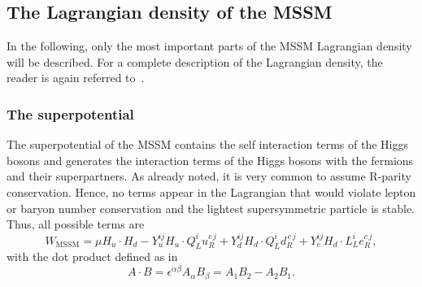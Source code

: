 \renewcommand{\arraystretch}{1.5}
\begin{table}[!h]
\centering
\caption{Vector supermultiplets in the MSSM.}
\label{tab:vector_multiplets}
\end{table}  



\subsection{The Lagrangian density of the MSSM}
\label{sec:Lagrange_MSSM}
In the following, only the most important parts of the MSSM Lagrangian density will be described.
For a complete description of the Lagrangian density, the reader is again referred to~\cite{bib:Drees_2004}.

\subsubsection*{The superpotential}
The superpotential of the MSSM contains the self interaction terms of the Higgs bosons and generates the interaction terms of the Higgs bosons with the fermions and their superpartners.
As already noted, it is very common to assume R-parity conservation.
Hence, no terms appear in the Lagrangian that would violate lepton or baryon number conservation and the lightest supersymmetric particle is stable.
Thus, all possible terms are
\begin{equation}
\label{eq:SPMSSM}
 W_{\text{MSSM}} = \mu H_u \cdot H_d - Y_u^{ij} H_u \cdot Q_L^i u_R^{c\,j} + Y_d^{ij} H_d \cdot Q_L^i d_R^{\,c\,j} + Y_e^{ij} H_d \cdot L_L^i e_R^{c\,j},
\end{equation}
with the dot product defined as in~\cite{bib:Aitchison_2005} 
\begin{equation}
 A \cdot B = \epsilon^{\alpha\beta} A_{\alpha} B_{\beta} = A_1 B_2 - A_2 B_1.
\end{equation}

